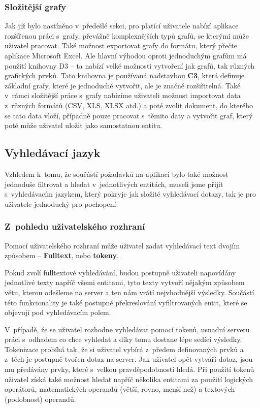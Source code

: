 \subsubsection{Složitější grafy}
\par Jak již bylo nastíněno v~předešlé sekci, pro platící uživatele nabízí aplikace rozšířenou práci s~grafy, převážně komplexnějších typů grafů, se kterými může uživatel pracovat. Také možnost exportovat grafy do formátu, který přečte aplikace Microsoft Excel. Ale hlavní výhodou oproti jednoduchým grafům má použití knihovny D3 -- ta nabízí velké možnosti vytvoření jak grafů, tak různých grafických prvků. Tato knihovna je používaná nadstavbou \textbf{C3}, která definuje základní grafy, které je jednoduché vytvořit, ale je značně rozšiřitelná. Také v~rámci složitější práce s~grafy nabízíme uživateli možnost importovat data z~různých formátů (CSV, XLS, XLSX atd.) a poté zvolit dokument, do kterého se tato data vloží, případně pouze pracovat s~těmito daty a vytvořit graf, který poté může uživatel uložit jako samostatnou entitu.

\subsection{Vyhledávací jazyk}
\par Vzhledem k~tomu, že součástí požadavků na aplikaci bylo také možnost jednoduše filtrovat a hledat v~jednotlivých entitách, museli jsme přijít s~vyhledávacím jazykem, který pokryje jak složité vyhledávací dotazy, tak je pro uživatele jednoduchý pro pochopení.

\subsubsection{Z~pohledu uživatelského rozhraní}
\par Pomocí uživatelského rozhraní může uživatel zadat vyhledávací text dvojím způsobem -- \textbf{Fulltext}, nebo \textbf{tokeny}.

\par Pokud zvolí fulltextové vyhledávání, budou postupně uživateli napovídány jednotlivé texty napříč všemi entitami, tyto texty vytvoří nějakým způsobem větu, kterou odešleme na server a ten nám vrátí nejvhodnější výsledky. Součástí této funkcionality je také postupné překreslování vyfiltrovaných entit, které se objevují pod vyhledávacím polem.

\par V~případě, že se uživatel rozhodne vyhledávat pomocí tokenů, usnadní serveru práci s~odhadem co chce vyhledat a díky tomu dostane lépe sedící výsledky. Tokenizace probíhá tak, že si uživatel vybírá z~předem definovaných prvků a z~těch je postupně tvořen dotaz na server. Jak uživatel opět vytváří dotaz, jsou mu předávány prvky, které s~velkou pravděpodobností hledá. Při použití tokenů uživatel získá také možnost hledat napříč několika entitami za použití logických operátorů, matematických operandů (větší, rovno, menší než) a textových (podobnost) operandů.

